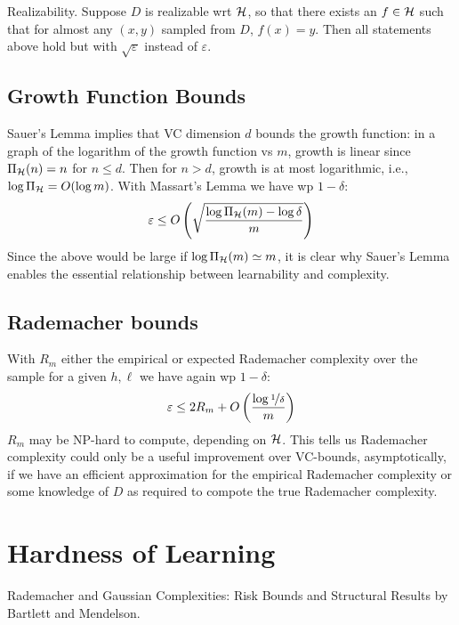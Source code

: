 \documentclass{article}
\begin{document}
Realizability. Suppose $D$ is realizable wrt $\mathcal{H}$, so that there exists an $f\in\mathcal{H}$ such that for almost any $(x,y)$ sampled from $D$, $f(x)=y$. Then all statements above hold but with $\sqrt{\varepsilon}$ instead of $\varepsilon$.


\subsection{Growth Function Bounds}

Sauer's Lemma implies that VC dimension $d$ bounds the growth function: in a graph of the logarithm of the growth function vs $m$, growth is linear since $\Pi_{\mathcal{H}}(n)=n$ for $n\le d$. Then for $n>d$, growth is at most logarithmic, i.e., $\log\Pi_{\mathcal{H}}=O(\log m)$. With Massart's Lemma we have wp $1-\delta$:
$$
\varepsilon\le O\left({\sqrt{\frac{\log\Pi_{\mathcal{H}}(m)-\log\delta}{m}}}\right)
$$
Since the above would be large if $\log\Pi_{\mathcal{H}}(m)\simeq m$, it is clear why Sauer's Lemma enables the essential relationship between learnability and complexity.

\subsection{Rademacher bounds}

With $R_m$ either the empirical or expected Rademacher complexity over the sample for a given $h,\ell$ we have again wp $1-\delta$:
$$
\varepsilon\le 2R_m+O\left({\frac{\log\nicefrac{1}{\delta}}{m}}\right)
$$
$R_m$ may be NP-hard to compute, depending on $\mathcal{H}$. This tells us Rademacher complexity could only be a useful improvement over VC-bounds, asymptotically, if we have an efficient approximation for the empirical Rademacher complexity or some knowledge of $D$ as required to compote the true Rademacher complexity.

\section{Hardness of Learning}

Rademacher and Gaussian Complexities: Risk Bounds and Structural Results by Bartlett and Mendelson.
\end{document}
